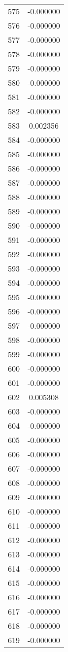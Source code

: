 \documentclass[12pt]{article}
\begin{document}
\begin{longtable}{@{}cc@{}}
575 & -0.000000 \\
576 & -0.000000 \\
577 & -0.000000 \\
578 & -0.000000 \\
579 & -0.000000 \\
580 & -0.000000 \\
581 & -0.000000 \\
582 & -0.000000 \\
583 & 0.002356 \\
584 & -0.000000 \\
585 & -0.000000 \\
586 & -0.000000 \\
587 & -0.000000 \\
588 & -0.000000 \\
589 & -0.000000 \\
590 & -0.000000 \\
591 & -0.000000 \\
592 & -0.000000 \\
593 & -0.000000 \\
594 & -0.000000 \\
595 & -0.000000 \\
596 & -0.000000 \\
597 & -0.000000 \\
598 & -0.000000 \\
599 & -0.000000 \\
600 & -0.000000 \\
601 & -0.000000 \\
602 & 0.005308 \\
603 & -0.000000 \\
604 & -0.000000 \\
605 & -0.000000 \\
606 & -0.000000 \\
607 & -0.000000 \\
608 & -0.000000 \\
609 & -0.000000 \\
610 & -0.000000 \\
611 & -0.000000 \\
612 & -0.000000 \\
613 & -0.000000 \\
614 & -0.000000 \\
615 & -0.000000 \\
616 & -0.000000 \\
617 & -0.000000 \\
618 & -0.000000 \\
619 & -0.000000 \\

\end{longtable}
\end{document}
